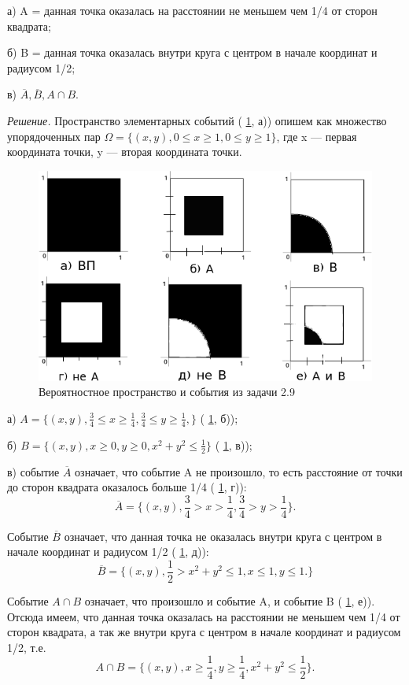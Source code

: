 \documentclass{book}
\begin{document}
а) A = {данная точка оказалась на расстоянии не меньшем чем 1/4 от сторон квадрата};

б) B = {данная точка оказалась внутри круга с центром в начале координат и радиусом 1/2};

в) $ \overline{ A }, \overline{ B }, A \cap B $.

\textit{Решение.} Пространство элементарных событий ( \ref{fig:29}, а)) опишем как множество упорядоченных пар
$ \Omega = \{ (x, y), 0 \leq x \geq 1, 0 \leq y \geq 1 \} $, где x --- первая координата точки, y --- вторая координата точки.

\begin{figure}[h!]
  \centering
  \includegraphics[width=.7\textwidth]{./pictures/2_9.png}
  \caption{Вероятностное пространство и события из задачи 2.9}
  \label{fig:29}
\end{figure}

а) $ A = \{ (x, y), \frac{3}{4} \leq x \geq \frac{1}{4}, \frac{3}{4} \leq y \geq \frac{1}{4}, \} $ ( \ref{fig:29}, б));

б) $ B = \{ (x, y), x \geq 0, y \geq 0, x^2 + y^2 \leq \frac{1}{2} \} $ ( \ref{fig:29}, в));

в) событие $ \overline{ A } $ означает, что событие A не произошло, то есть расстояние от точки до сторон квадрата оказалось больше 1/4 ( \ref{fig:29}, г)):
$$ \overline{ A } =
\{ (x, y), \frac{3}{4} > x > \frac{1}{4},
\frac{3}{4} > y > \frac{1}{4} \}.$$

Событие $ \overline{ B } $ означает, что данная точка не оказалась внутри круга с центром в начале координат и радиусом 1/2 ( \ref{fig:29}, д)):
$$ \overline{ B } =
\{ (x, y),
\frac{1}{2} > x^2 + y^2 \leq 1,
x \leq 1,
y \leq 1. \} $$

Событие $ A \cap B $ означает, что произошло и событие A, и событие B ( \ref{fig:29}, е)).
Отсюда имеем, что данная точка оказалась на расстоянии не меньшем чем 1/4 от сторон квадрата, а так же внутри круга с центром в начале координат и радиусом 1/2, т.е.
$$ A \cap B =
\{ (x, y),
x \geq \frac{1}{4},
y \geq \frac{1}{4},
x^2 + y^2 \leq \frac{1}{2} \}.$$
\end{document}
